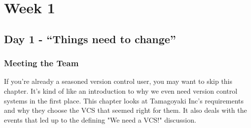 \cleardoublepage
{}
\chapter*{Week 1}
\section*{Day 1 - ``Things need to change''}
\subsection*{Meeting the Team}

If you're already a seasoned version control user, you may want to skip this chapter.  It's kind of like an introduction to why we even need version control systems in the first place.  This chapter looks at Tamagoyaki Inc's requirements and why they choose the VCS that seemed right for them.  It also deals with the events that led up to the defining "We need a VCS!" discussion.

